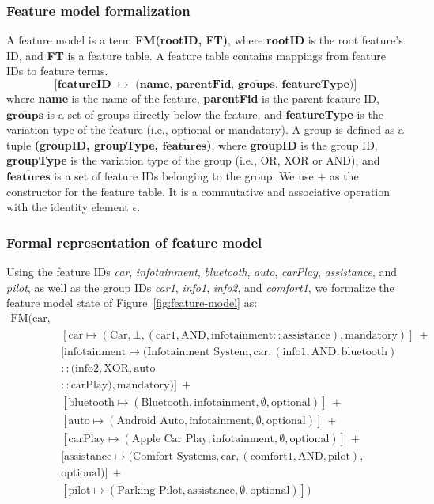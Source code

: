 \documentclass[a4paper,english]{ifimaster}
\begin{document}
\subsubsection*{Feature model formalization}
\label{def:feature-model}
A feature model is a term \textbf{FM(rootID, FT)}, where \textbf{rootID} is the root feature's ID, and
\textbf{FT} is a feature table. A feature table contains mappings from feature IDs to feature terms. 
$$
\textbf{[featureID $\mapsto$ (name, parentFid, $\overline{\textbf{groups}}$, featureType)]}
$$
where \textbf{name} is the name of the feature, \textbf{parentFid} is the parent feature ID, \textbf{$\overline{\textbf{groups}}$} is a set of groups directly below the feature, and \textbf{featureType} is the variation type of the feature (i.e., optional or mandatory). 
A group is defined as a tuple \textbf{(groupID, groupType, $\overline{\textbf{features}}$)}, where \textbf{groupID} is the group ID, \textbf{groupType} is the variation type of the group (i.e., OR, XOR or AND), and \textbf{$\overline{\textbf{features}}$} is a set of feature IDs belonging to the group. 
%
We use + as the constructor for the feature table. It is a commutative and associative operation with the identity element $\epsilon$.

\subsubsection*{Formal representation of feature model}
Using the feature IDs \emph{car}, \emph{infotainment}, \emph{bluetooth}, \emph{auto}, \emph{carPlay}, \emph{assistance}, and \emph{pilot}, as well as the group IDs \emph{car1}, \emph{info1}, \emph{info2}, and \emph{comfort1}, we formalize the feature model state of Figure~\vref{fig:feature-model} as:
\begin{align*}
    \text{FM}(\text{car}, &\\
    & [\text{car} \mapsto (\text{Car}, \bot , (\text{car1}, \text{AND}, \text{infotainment} :: \text{assistance}), \text{mandatory})]\ +\\
    & [\text{infotainment} \mapsto (\text{Infotainment System}, \text{car}, (\text{info1}, \text{AND}, \text{bluetooth}) \\
    & :: (\text{info2}, \text{XOR}, \text{auto}\\
    & :: \text{carPlay}), \text{mandatory})]\ + \\
    & [\text{bluetooth} \mapsto (\text{Bluetooth}, \text{infotainment}, \emptyset, \text{optional})]\ + \\
    & [\text{auto} \mapsto (\text{Android Auto}, \text{infotainment}, \emptyset, \text{optional})]\ + \\
    & [\text{carPlay} \mapsto (\text{Apple Car Play}, \text{infotainment}, \emptyset, \text{optional})]\ + \\
    & [\text{assistance} \mapsto (\text{Comfort Systems}, \text{car}, (\text{comfort1}, \text{AND}, \text{pilot}), \\ 
    & \text{optional})]\ + \\
    & [\text{pilot} \mapsto  (\text{Parking Pilot}, \text{assistance}, \emptyset, \text{optional})]) 
\end{align*}
\end{document}
